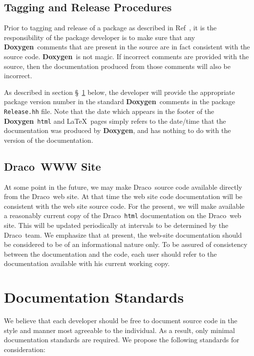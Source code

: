 \documentclass[11pt]{nmemo}
\newcommand{\draco}{{\normalfont\sffamily Draco}}
\newcommand{\doxy}{{\normalfont\bfseries Doxygen}}
\begin{document}
\subsection{Tagging and Release Procedures}
\label{sec:reltag}
Prior to tagging and release of a package as described in Ref~\cite{xtm:9936},
 it is 
the responsibility of the package developer is to make sure that any \doxy\
comments that are present in the source are in fact consistent with the
source code. \doxy\ is not magic. If incorrect comments are provided with
the source, then the documentation produced from those comments will also
be incorrect.

As described in section \S~\ref{sec:std} below, 
the developer will provide 
the appropriate package version number in the standard \doxy\ comments in the 
package \texttt{Release.hh} file.
Note that the date which appears in the footer of the \doxy\ 
\texttt{html} and \LaTeX\ pages
simply refers to the date/time that the documentation was produced by \doxy, 
and has nothing to do with the version of the documentation.

\subsection{\draco\ WWW Site}
\label{sec:www}

At some point in the future, we may make \draco\ source code available
directly from the \draco\ web site. At that time the web site code
documentation will be consistent with the web site source code.
For the present, 
we will make available a reasonably current copy of the \draco\ \texttt{html}
documentation on the \draco\ web site. This will be updated periodically
at intervals to be determined by the \draco\ team. 
We emphasize that at present, the web-site documentation should be 
considered to be of an informational nature only. To be assured of
consistency between the documentation and the code, each
user should refer to the documentation available with 
his current working copy.



\section{Documentation Standards}
\label{sec:std}

We believe that each developer should be free to document source code
in the style and manner most agreeable to the individual. As a result,
only minimal documentation standards are required.  We propose the
following standards for consideration:
\end{document}

